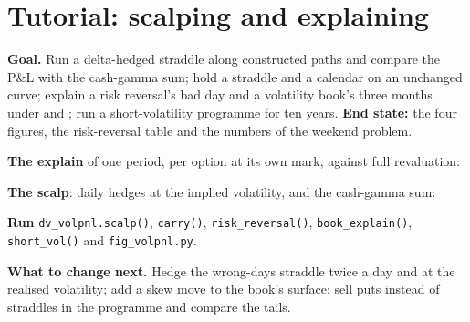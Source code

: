 \begin{omfigure}

\label{fig:dv:trading-volatility:vrp}
\end{omfigure}

\section{Tutorial: scalping and explaining}\label{tut:dv:trading-volatility:tut}

\begin{tutorial}
\textbf{Goal.} Run a delta-hedged straddle along constructed paths and compare the P\&L with the cash-gamma sum; hold a straddle and a calendar on an
unchanged curve; explain a risk reversal's bad day and a volatility book's three months under  and ; run a short-volatility
programme for ten years. \textbf{End state:} the four figures, the risk-reversal table and the numbers of the weekend problem.
\begin{tutsteps}
\item \textbf{The explain} of one period, per option at its own mark, against full revaluation:
\label{lst:dv:trading-volatility:explain}
\item \textbf{The scalp}: daily hedges at the implied volatility, and the cash-gamma sum:
\label{lst:dv:trading-volatility:scalp}
\item \textbf{Run} \texttt{dv\_volpnl.scalp()}, \texttt{carry()}, \texttt{risk\_reversal()}, \texttt{book\_explain()}, \texttt{short\_vol()} and
\texttt{fig\_volpnl.py}.
\end{tutsteps}
\textbf{What to change next.} Hedge the wrong-days straddle twice a day and at the realised volatility; add a skew move to the book's surface; sell
puts instead of straddles in the programme and compare the tails.
\end{tutorial}

